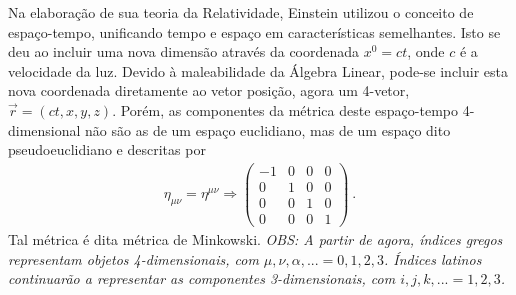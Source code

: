 \documentclass[a4paper,12pt]{article}
\begin{document}
\indent \par Na elaboração de sua teoria da Relatividade, Einstein utilizou o conceito de espaço-tempo, unificando tempo e espaço em características semelhantes. Isto se deu ao incluir uma nova dimensão através da coordenada $x^{0}=ct$, onde $c$ é a velocidade da luz. Devido à maleabilidade da Álgebra Linear, pode-se incluir esta nova coordenada diretamente ao vetor posição, agora um 4-vetor, $\vec{r}= (ct,x,y,z)$. Porém, as componentes da métrica deste espaço-tempo 4-dimensional não são as de um espaço euclidiano, mas de um espaço dito pseudoeuclidiano e descritas por 
%
\begin{eqnarray}
  \nonumber
  \eta_{\mu \nu}=\eta^{\mu \nu} \Rightarrow  
  \begin{pmatrix}
 -1 & 0 & 0 & 0 \\
 0 & 1 & 0 & 0 \\
 0 & 0 & 1 & 0 \\
 0 & 0 & 0 & 1  
\end{pmatrix}~.
%
 \end{eqnarray}
%
\noindent Tal métrica é dita métrica de Minkowski. {\it{OBS: A partir de agora, índices gregos representam objetos 4-dimensionais, com $\mu,\nu, \alpha,... = 0,1,2,3$. Índices latinos continuarão a representar as componentes 3-dimensionais, com $i,j,k,... = 1,2,3$.}} 
%
\end{document}
